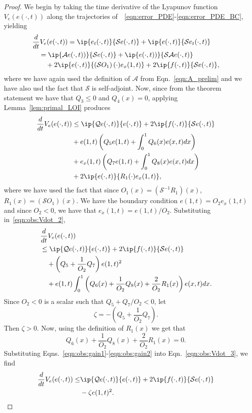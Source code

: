 \documentclass[US letter, 9 pt, conference]{ieeeconf}  \usepackage{setspace}
\newcommand{\igzo}{\int_0^1}
\newcommand{\mcl}[1]{\mathcal{#1}}
\newcommand{\sop}{\mathcal{S}}
\newcommand{\sinv}{\mathcal{S}^{-1}}
\begin{document}
\begin{proof}
We begin by taking the time derivative of the Lyapunov function $V_e(e(\cdot,t))$ along the trajectories of~~\eqref{eqn:error_PDE}-\eqref{eqn:error_PDE_BC}, yielding
\begin{align}
&\frac{d}{dt}V_e(e(\cdot,t))=\ip{e_t(\cdot,t)}{\sop e(\cdot,t)}+\ip{e(\cdot,t)}{\sop e_t(\cdot,t)} \nonumber \\
&\quad = \ip{\mcl{A}e(\cdot,t))}{\sop e(\cdot,t)}+\ip{e(\cdot,t))}{\sop \mcl{A} e(\cdot,t)} \nonumber \\
&\label{eqn:obs:Vdot_1}\qquad + 2 \ip{e(\cdot,t)}{\left(\sop O_1 \right)(\cdot)e_x(1,t)}+2\ip{f(\cdot,t)}{\sop e(\cdot,t)},
\end{align} where we have again used the definition of $\mcl{A}$ from Eqn.~\eqref{eqn:A_prelim} and we have also usd the fact that $\sop$ is self-adjoint. Now, since from the theorem statement we have that $Q_3 \leq 0$ and $Q_4(x)=0$, applying Lemma~\ref{lem:primal_LOI} produces
\begin{align}
\frac{d}{dt}V_e(e(\cdot,t))&\leq \ip{\mcl{Q}e(\cdot,t)}{e(\cdot,t)}+2\ip{f(\cdot,t)}{\sop e(\cdot,t)} \nonumber \\
&+ e(1,t)\left(Q_5 e(1,t)+\igzo Q_6(x)e(x,t)dx \right) \nonumber \\
&+ e_x(1,t)\left(Q_7 e(1,t)+\igzo Q_8(x)e(x,t)dx \right) \nonumber \\
&\label{eqn:obs:Vdot_2}+ 2 \ip{e(\cdot,t)}{R_1(\cdot)e_x(1,t)},
\end{align} where we have used the fact that since $O_1(x)=\left(\sinv R_1\right)(x)$, $R_1(x)=\left(\sop O_1\right)(x)$. We have the boundary condition $e(1,t)=O_2 e_x(1,t)$ and since $O_2<0$, we have that $e_x(1,t)=e(1,t)/O_2$. Substituting in~\eqref{eqn:obs:Vdot_2},
\begin{align}
&\frac{d}{dt}V_e(e(\cdot,t)) \nonumber \\
&\leq \ip{\mcl{Q}e(\cdot,t)}{e(\cdot,t)}+2\ip{f(\cdot,t)}{\sop e(\cdot,t)} \nonumber \\
& \quad +\left(Q_5+\frac{1}{O_2}Q_7 \right)e(1,t)^2 \nonumber \\
&\label{eqn:obs:Vdot_3} \quad +e(1,t)\igzo \left(Q_6(x)+\frac{1}{O_2}Q_8(x)+\frac{2}{O_2} R_1(x) \right)e(x,t)dx.
\end{align} Since $O_2<0$ is a scalar such that $Q_5+Q_7/O_2<0$, let
\begin{equation}\label{eqn:obs:gain1}
\zeta=-(Q_5+\frac{1}{O_2}Q_7).
\end{equation} Then $\zeta>0$. Now, using the definition of $R_1(x)$ we get that
\begin{equation}\label{eqn:obs:gain2}
Q_6(x)+\frac{1}{O_2}Q_8(x)+\frac{2}{O_2} R_1(x)=0.
\end{equation} Substituting Eqns.~\eqref{eqn:obs:gain1}-\eqref{eqn:obs:gain2} into Eqn.~\eqref{eqn:obs:Vdot_3}, we find
\begin{align*}
\frac{d}{dt}V_e(e(\cdot,t))\leq&\ip{\mcl{Q}e(\cdot,t)}{e(\cdot,t)}+2\ip{f(\cdot,t)}{\sop e(\cdot,t)} \nonumber \\
&  -\zeta e(1,t)^2.
\end{align*}
\end{proof}
\end{document}
